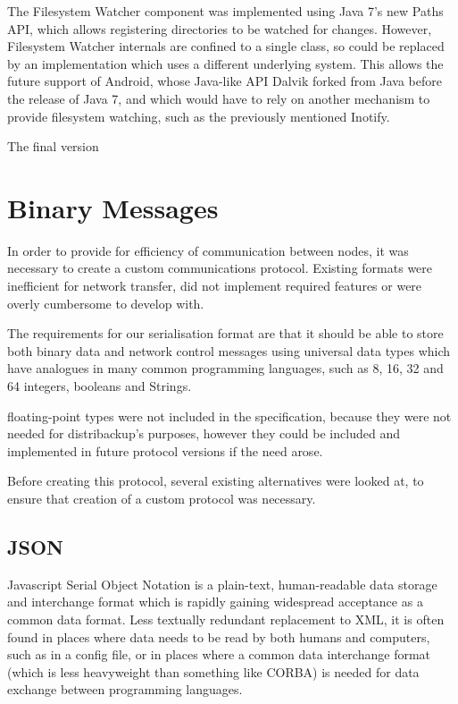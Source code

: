 \documentclass[12pt,a4paper,]{adreport}
\begin{document}
The Filesystem Watcher component was implemented using Java 7's new
Paths API, which allows registering directories to be watched for
changes. However, Filesystem Watcher internals are confined to a single
class, so could be replaced by an implementation which uses a different
underlying system. This allows the future support of Android, whose
Java-like API Dalvik forked from Java before the release of Java 7, and
which would have to rely on another mechanism to provide filesystem
watching, such as the previously mentioned Inotify.

The final version

\section{Binary Messages}\label{binary-messages}

In order to provide for efficiency of communication between nodes, it
was necessary to create a custom communications protocol. Existing
formats were inefficient for network transfer, did not implement
required features or were overly cumbersome to develop with.

The requirements for our serialisation format are that it should be able
to store both binary data and network control messages using universal
data types which have analogues in many common programming languages,
such as 8, 16, 32 and 64 integers, booleans and Strings.

floating-point types were not included in the specification, because
they were not needed for distribackup's purposes, however they could be
included and implemented in future protocol versions if the need arose.

Before creating this protocol, several existing alternatives were looked
at, to ensure that creation of a custom protocol was necessary.

\subsection{JSON}\label{json}

Javascript Serial Object Notation is a plain-text, human-readable data
storage and interchange format which is rapidly gaining widespread
acceptance as a common data format. Less textually redundant replacement
to XML, it is often found in places where data needs to be read by both
humans and computers, such as in a config file, or in places where a
common data interchange format (which is less heavyweight than something
like CORBA) is needed for data exchange between programming languages.
\end{document}
